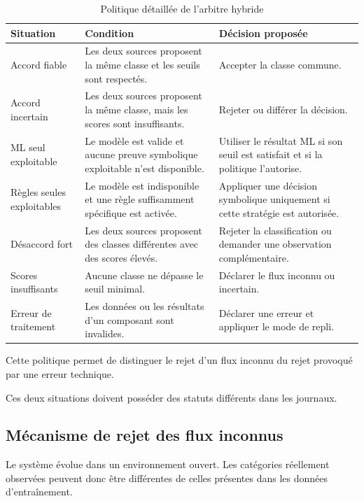 \begin{table}[H]
\centering
\caption{Politique détaillée de l'arbitre hybride}
\label{tab:politique_arbitrage_detaillee}
\small
\begin{tabularx}{\textwidth}{|X|X|X|}
\hline
\textbf{Situation} & \textbf{Condition} & \textbf{Décision proposée} \\
\hline
Accord fiable &
Les deux sources proposent la même classe et les seuils sont respectés. &
Accepter la classe commune. \\
\hline
Accord incertain &
Les deux sources proposent la même classe, mais les scores sont insuffisants. &
Rejeter ou différer la décision. \\
\hline
ML seul exploitable &
Le modèle est valide et aucune preuve symbolique exploitable n'est disponible. &
Utiliser le résultat ML si son seuil est satisfait et si la politique l'autorise. \\
\hline
Règles seules exploitables &
Le modèle est indisponible et une règle suffisamment spécifique est activée. &
Appliquer une décision symbolique uniquement si cette stratégie est autorisée. \\
\hline
Désaccord fort &
Les deux sources proposent des classes différentes avec des scores élevés. &
Rejeter la classification ou demander une observation complémentaire. \\
\hline
Scores insuffisants &
Aucune classe ne dépasse le seuil minimal. &
Déclarer le flux inconnu ou incertain. \\
\hline
Erreur de traitement &
Les données ou les résultats d'un composant sont invalides. &
Déclarer une erreur et appliquer le mode de repli. \\
\hline
\end{tabularx}
\end{table}

Cette politique permet de distinguer le rejet d'un flux inconnu du rejet provoqué par une erreur technique.

Ces deux situations doivent posséder des statuts différents dans les journaux.

\subsection{Mécanisme de rejet des flux inconnus}

Le système évolue dans un environnement ouvert. Les catégories réellement observées peuvent donc être différentes de celles présentes dans les données d'entraînement.

